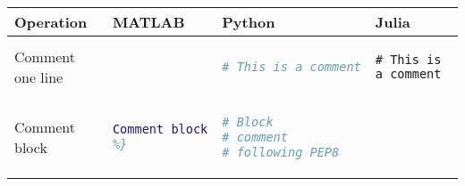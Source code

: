 \documentclass[10pt, landscape]{article}
\begin{document}
\begin{multicols}{2}
\begin{tabular}[]{@{}llll@{}}
\toprule
\begin{minipage}[b]{0.19\columnwidth}\raggedright\strut
Operation\strut
\end{minipage} & \begin{minipage}[b]{0.22\columnwidth}\raggedright\strut
MATLAB\strut
\end{minipage} & \begin{minipage}[b]{0.22\columnwidth}\raggedright\strut
Python\strut
\end{minipage} & \begin{minipage}[b]{0.25\columnwidth}\raggedright\strut
Julia\strut
\end{minipage}\tabularnewline
\midrule
\begin{minipage}[t]{0.19\columnwidth}\raggedright\strut
Comment one line\strut
\end{minipage} & \begin{minipage}[t]{0.22\columnwidth}\raggedright\strut
\begin{lstlisting}[language=Matlab]
% This is a comment
\end{lstlisting}
\strut
\end{minipage} & \begin{minipage}[t]{0.22\columnwidth}\raggedright\strut
\begin{lstlisting}[language=Python]
# This is a comment
\end{lstlisting}
\strut
\end{minipage} & \begin{minipage}[t]{0.25\columnwidth}\raggedright\strut
\begin{lstlisting}
# This is a comment
\end{lstlisting}
\strut
\end{minipage}\tabularnewline
\begin{minipage}[t]{0.19\columnwidth}\raggedright\strut
Comment block\strut
\end{minipage} & \begin{minipage}[t]{0.22\columnwidth}\raggedright\strut
\begin{lstlisting}[language=Matlab]
%{
Comment block
%}
\end{lstlisting}
\strut
\end{minipage} & \begin{minipage}[t]{0.22\columnwidth}\raggedright\strut
\begin{lstlisting}[language=Python]
# Block
# comment
# following PEP8
\end{lstlisting}

\end{minipage}
\end{tabular}
\end{multicols}
\end{document}
